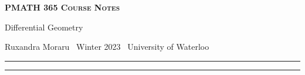 \documentclass[10pt]{article}
\numberwithin{equation}{section}
\newcommand{\newtitle}[4]{
  \begin{center}
	\huge{\textbf{\textsc{#1 Course Notes}}}
    
	\large{\sc #2}
    
	{\sc #3 \textbullet\, #4 \textbullet\, University of Waterloo}
	\normalsize\vspace{1cm}\hrule
  \end{center}
}
\begin{document}
\pagestyle{fancy}
\newtitle{PMATH 365}{Differential Geometry}{Ruxandra Moraru}{Winter 2023}

\tableofcontents
\vspace{1cm}\hrule
\fancyhead[R]{\nouppercase\rightmark}
\newpage 
{}

\newpage
\newpage
\end{document}
